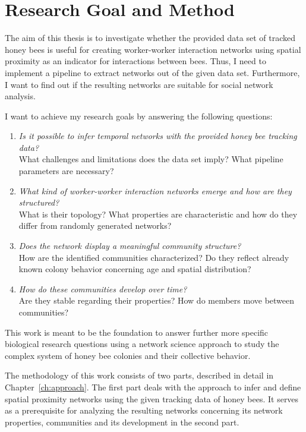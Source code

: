 \section{Research Goal and Method}
\label{sec:intro:goals}
The aim of this thesis is to investigate whether the provided data set of tracked honey bees is useful for creating worker-worker interaction networks using spatial proximity as an indicator for interactions between bees. Thus, I need to implement a pipeline to extract networks out of the given data set. Furthermore, I want to find out if the resulting networks are suitable for social network analysis.

I want to achieve my research goals by answering the following questions:

\begin{enumerate}
\item \emph{Is it possible to infer temporal networks with the provided honey bee tracking data?}\\
What challenges and limitations does the data set imply?
What pipeline parameters are necessary?
\item \emph{What kind of worker-worker interaction networks emerge and how are they structured?}\\
What is their topology?
What properties are characteristic and how do they differ from randomly generated networks?
\item \emph{Does the network display a meaningful community structure?}\\
How are the identified communities characterized?
Do they reflect already known colony behavior concerning age and spatial distribution?
\item \emph{How do these communities develop over time?}\\
Are they stable regarding their properties?
How do members move between communities?
\end{enumerate}


This work is meant to be the foundation to answer further more specific biological research questions using a network science approach to study the complex system of honey bee colonies and their collective behavior.

The methodology of this work consists of two parts, described in detail in Chapter~\ref{ch:approach}. The first part deals with the approach to infer and define spatial proximity networks using the given tracking data of honey bees. It serves as a prerequisite for analyzing the resulting networks concerning its network properties, communities and its development in the second part. 


